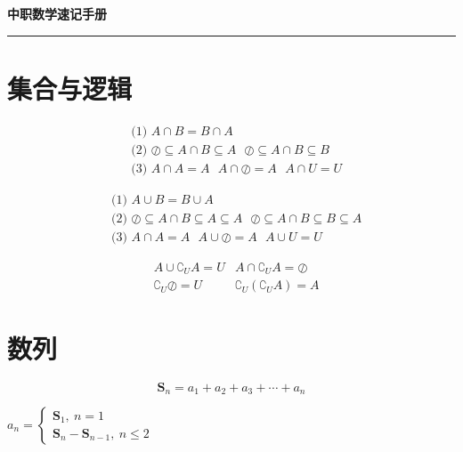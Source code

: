 \documentclass[a5paper]{article}
\title{}
\author{}
\date{}
\begin{document}

\begin{center}
    \textbf{\LARGE 中职数学速记手册}
    \vspace{5pt}
\end{center}
\hrule height 1pt

\section{{\large \textbf{集合与逻辑}}}

\begin{align*}
    & \text{(1)~} A \cap B = B \cap A \\
    & \text{(2)~} \oslash \subseteq A \cap B \subseteq A ~~~ \oslash \subseteq A \cap B \subseteq B \\
    & \text{(3)~} A \cap A = A ~~~ A \cap \oslash = A ~~~ A \cap U = U
\end{align*}

\begin{align*}
    & \text{(1)~} A \cup B = B \cup A \\
    & \text{(2)~} \oslash \subseteq A \cap B \subseteq A \subseteq A ~~~ \oslash \subseteq A \cap B \subseteq B \subseteq A \\
    & \text{(3)~} A \cap A = A ~~~ A \cup \oslash = A ~~~ A \cup U = U
\end{align*}

\begin{align*}
    & A \cup \complement_{U}A = U & A \cap \complement_{U}A = \oslash \\
    & \complement_{U}\oslash = U & \complement_{U}(\complement_{U}A) = A
\end{align*}

\section{{\large \textbf{数列}}}

\begin{equation*}
    \textbf{S}_n = a_1 + a_2 + a_3 + \cdots + a_n
\end{equation*}
\begin{center}
	\begin{math}
	    a_n =
        \begin{cases}
            \textbf{S}_1,~n = 1 \\
            \textbf{S}_n - \textbf{S}_{n-1},~n \le 2 
        \end{cases}
    \end{math}
\end{center}
\end{document}
